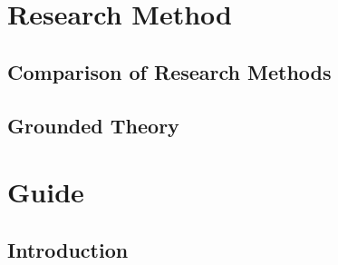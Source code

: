 



\frontmatter 

\cleardoublepage

\cleardoublepage

\cleardoublepage


\mainmatter



\part*{Research Method}

\chapter{Comparison of Research Methods}
\label{chap:CompareResearchMethod}


\chapter{Grounded Theory}
\label{chap:groundedTheory}


\part*{Guide}

\chapter{Introduction}
\label{chap:intro}


%
%
%
%
%


